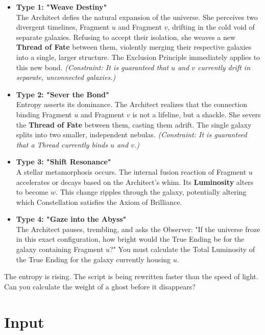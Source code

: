 \documentclass[11pt, letterpaper]{article}
\begin{document}
\begin{itemize}
    \item \textbf{Type 1: "Weave Destiny"} \\
    The Architect defies the natural expansion of the universe. She perceives two divergent timelines, Fragment $u$ and Fragment $v$, drifting in the cold void of separate galaxies. Refusing to accept their isolation, she weaves a new \textbf{Thread of Fate} between them, violently merging their respective galaxies into a single, larger structure. The Exclusion Principle immediately applies to this new bond.
    \textit{(Constraint: It is guaranteed that $u$ and $v$ currently drift in separate, unconnected galaxies.)}

    \item \textbf{Type 2: "Sever the Bond"} \\
    Entropy asserts its dominance. The Architect realizes that the connection binding Fragment $u$ and Fragment $v$ is not a lifeline, but a shackle. She severs the \textbf{Thread of Fate} between them, casting them adrift. The single galaxy splits into two smaller, independent nebulas.
    \textit{(Constraint: It is guaranteed that a Thread currently binds $u$ and $v$.)}

    \item \textbf{Type 3: "Shift Resonance"} \\
    A stellar metamorphosis occurs. The internal fusion reaction of Fragment $u$ accelerates or decays based on the Architect's whim. Its \textbf{Luminosity} alters to become $w$. This change ripples through the galaxy, potentially altering which Constellation satisfies the Axiom of Brilliance.
    
    \item \textbf{Type 4: "Gaze into the Abyss"} \\
    The Architect pauses, trembling, and asks the Observer: "If the universe froze in this exact configuration, how bright would the True Ending be for the galaxy containing Fragment $u$?" You must calculate the Total Luminosity of the True Ending for the galaxy currently housing $u$.
\end{itemize}

The entropy is rising. The script is being rewritten faster than the speed of light. Can you calculate the weight of a ghost before it disappears?

\section*{Input}
\end{document}
